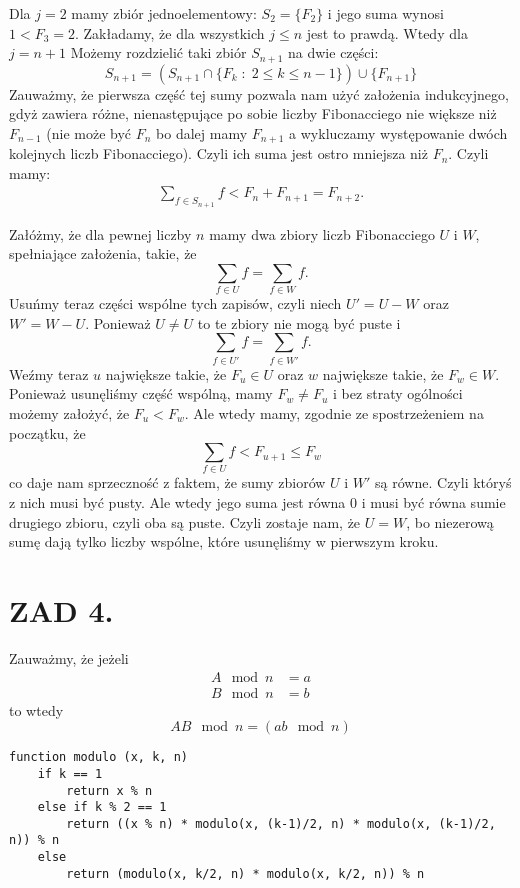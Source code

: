 \documentclass{article}[13pt]
\begin{document}
    Dla $j=2$ mamy zbiór jednoelementowy: $S_2=\{F_2\}$ i jego suma wynosi $1<F_3=2$. Zakładamy, że dla wszystkich $j\leq n$ jest to prawdą. Wtedy dla $j=n+1$ Możemy rozdzielić taki zbiór $S_{n+1}$ na dwie części:
    $$S_{n+1}=(S_{n+1}\cap\{F_k\;:\;2\leq k\leq n-1\})\cup\{F_{n+1}\}$$
    Zauważmy, że pierwsza część tej sumy pozwala nam użyć założenia indukcyjnego, gdyż zawiera różne, nienastępujące po sobie liczby Fibonacciego nie większe niż $F_{n-1}$ (nie może być $F_n$ bo dalej mamy $F_{n+1}$ a wykluczamy występowanie dwóch kolejnych liczb Fibonacciego). Czyli ich suma jest ostro mniejsza niż $F_{n}$. Czyli mamy:
    \begin{align*}
        \sum\limits_{f\in S_{n+1}}f<F_n+F_{n+1}=F_{n+2}.
    \end{align*}

    Załóżmy, że dla pewnej liczby $n$ mamy dwa zbiory liczb Fibonacciego $U$ i $W$, spełniające założenia, takie, że
    $$\sum\limits_{f\in U}f=\sum\limits_{f\in W}f.$$
    Usuńmy teraz części wspólne tych zapisów, czyli niech $U'=U-W$ oraz $W'=W-U$. Ponieważ $U\neq U$ to te zbiory nie mogą być puste i 
    $$\sum\limits_{f\in U'}f=\sum\limits_{f\in W'}f.$$
    Weźmy teraz $u$ największe takie, że $F_u\in U$ oraz $w$ największe takie, że $F_w\in W$. Ponieważ usunęliśmy część wspólną, mamy $F_w\neq F_u$ i bez straty ogólności możemy założyć, że $F_u<F_w$. Ale wtedy mamy, zgodnie ze spostrzeżeniem na początku, że
    $$\sum\limits_{f\in U}f<F_{u+1}\leq F_w$$
    co daje nam sprzeczność z faktem, że sumy zbiorów $U$ i $W'$ są równe. Czyli któryś z nich musi być pusty. Ale wtedy jego suma jest równa 0 i musi być równa sumie drugiego zbioru, czyli oba są puste. Czyli zostaje nam, że $U=W$, bo niezerową sumę dają tylko liczby wspólne, które usunęliśmy w pierwszym kroku.

    
    \section*{ZAD 4.}

    Zauważmy, że jeżeli
    \begin{align*}
        A\mod n&=a\\
        B\mod n&=b
    \end{align*}
    to wtedy
    $$AB\mod n=(ab\mod n)$$

\begin{lstlisting}[language=juleczka]
function modulo (x, k, n)
    if k == 1
        return x % n
    else if k % 2 == 1
        return ((x % n) * modulo(x, (k-1)/2, n) * modulo(x, (k-1)/2, n)) % n
    else
        return (modulo(x, k/2, n) * modulo(x, k/2, n)) % n
\end{lstlisting}
\end{document}
